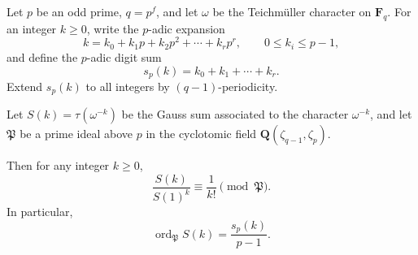 Let $p$ be an odd prime, $q = p^f$, and let $\omega$ be the Teichmüller character on $\mathbf{F}_q$. For an integer $k \ge 0$, write the $p$-adic expansion
$$k = k_0 + k_1 p + k_2 p^2 + \cdots + k_{r} p^{r}, \qquad 0 \le k_i \le p-1,$$
and define the $p$-adic digit sum
$$s_p(k) = k_0 + k_1 + \cdots + k_r.$$
Extend $s_p(k)$ to all integers by $(q-1)$-periodicity.

Let $S(k) = \tau(\omega^{-k})$ be the Gauss sum associated to the character $\omega^{-k}$, and let $\mathfrak{P}$ be a prime ideal above $p$ in the cyclotomic field $\mathbf{Q}(\zeta_{q-1}, \zeta_p)$.

Then for any integer $k \ge 0$,
$$\frac{S(k)}{S(1)^{k}} \equiv \frac{1}{k!} \pmod{\mathfrak{P}}.$$
In particular,
$$\operatorname{ord}_{\mathfrak{P}} S(k) = \frac{s_p(k)}{p-1}.$$
